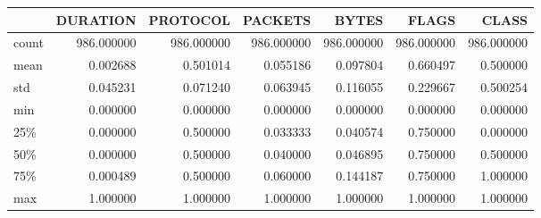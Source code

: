 \begin{tabular}{lrrrrrr}
\toprule
{} &    DURATION &    PROTOCOL &     PACKETS &       BYTES &       FLAGS &       CLASS \\
\midrule
count &  986.000000 &  986.000000 &  986.000000 &  986.000000 &  986.000000 &  986.000000 \\
mean  &    0.002688 &    0.501014 &    0.055186 &    0.097804 &    0.660497 &    0.500000 \\
std   &    0.045231 &    0.071240 &    0.063945 &    0.116055 &    0.229667 &    0.500254 \\
min   &    0.000000 &    0.000000 &    0.000000 &    0.000000 &    0.000000 &    0.000000 \\
25\%   &    0.000000 &    0.500000 &    0.033333 &    0.040574 &    0.750000 &    0.000000 \\
50\%   &    0.000000 &    0.500000 &    0.040000 &    0.046895 &    0.750000 &    0.500000 \\
75\%   &    0.000489 &    0.500000 &    0.060000 &    0.144187 &    0.750000 &    1.000000 \\
max   &    1.000000 &    1.000000 &    1.000000 &    1.000000 &    1.000000 &    1.000000 \\
\bottomrule
\end{tabular}
